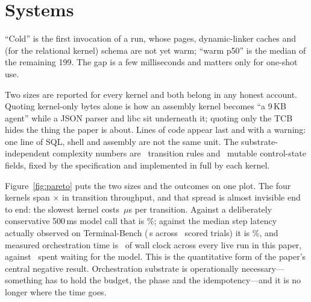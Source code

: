 \documentclass[11pt,a4paper]{article}
\newcommand{\widetable}[1]{\resizebox{\textwidth}{!}{}}
\begin{document}
\section{Systems}
\label{sec:systems}

\begin{table}[h]\centering\small
\caption{Footprint and performance. \emph{TCB} is the interpreter or binary,
every library it links, and---for the Python-backed kernels---exactly the
standard-library modules they import, not the whole install. Libraries in the
macOS dyld shared cache have no file on disk and count as zero, so \texttt{sh}
and \texttt{asm} are understated by libSystem.}
\label{tab:systems}
\widetable{gen/tab-systems}
\end{table}

``Cold'' is the first invocation of a run, whose pages, dynamic-linker caches
and (for the relational kernel) schema are not yet warm; ``warm p50'' is the
median of the remaining 199. The gap is a few milliseconds and matters only for
one-shot use.

Two sizes are reported for every kernel and both belong in any honest account.
Quoting kernel-only bytes alone is how an assembly kernel becomes ``a 9\,KB
agent'' while a JSON parser and libc sit underneath it; quoting only the TCB
hides the thing the paper is about. Lines of code appear last and with a
warning: one line of SQL, shell and assembly are not the same unit. The
substrate-independent complexity numbers are \almrules\ transition rules and
\almfields\ mutable control-state fields, fixed by the specification and
implemented in full by each kernel.

\begin{table}[h]\centering\small
\caption{Where the wall clock and the tokens go. $T_{orch}$ is everything that
is neither the model call nor the tool: prompt rendering, the ABI round trip,
and the kernel.}
\label{tab:cost}
\widetable{gen/tab-cost}
\end{table}

Figure~\ref{fig:pareto} puts the two sizes and the outcomes on one plot.
The four kernels span \throughputspread$\times$ in transition throughput, and
that spread is almost invisible end to end: the slowest kernel costs
\slowestus\,$\mu$s per transition. Against a deliberately conservative
500\,ms model call that is \slowestshare\%; against the median step latency
actually observed on Terminal-Bench (\stepwall\,s across \stepwalln\ scored
trials) it is \slowestshareobs\%,
and measured orchestration time is \orchshare\ of wall clock across every
live run in this paper, against \modelshare\ spent waiting for the model.
This is the quantitative form of the paper's central negative result.
Orchestration substrate is operationally necessary---something has to hold the
budget, the phase and the idempotency---and it is no longer where the time
goes.
\end{document}
